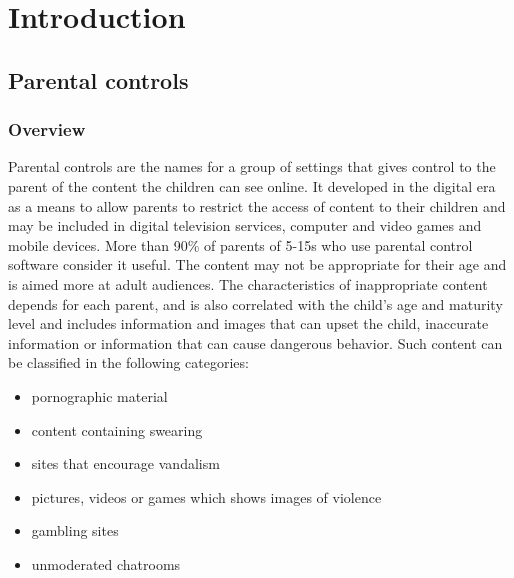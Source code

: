 
\chapter{Introduction} %

\label{Chapter1} %


\newcommand{\keyword}[1]{\textbf{#1}}
\newcommand{\tabhead}[1]{\textbf{#1}}
\newcommand{\code}[1]{\texttt{#1}}
\newcommand{\file}[1]{\texttt{\bfseries#1}}
\newcommand{\option}[1]{\texttt{\itshape#1}}


\section{Parental controls}

\subsection{Overview}
Parental controls \cite{parentalControls} are the names for a group of settings that gives control to the parent of the content the children can see online. It developed in the digital era as a means to allow parents to restrict the access of content to their children and may be included in digital television services, computer and video games and mobile devices. More than 90\% of parents  of 5-15s who use parental control software consider it useful. \citep{ofcom2017children} The content may not be appropriate for their age and is aimed more at adult audiences. The characteristics of inappropriate content depends for each parent, and is also correlated with the child's age and maturity level and includes information and images that can upset the child, inaccurate information or information that can cause dangerous behavior. Such content can be classified in the following categories:

\begin{itemize}
\item pornographic material
\item content containing swearing
\item sites that encourage vandalism
\item pictures, videos or games which shows images of violence
\item gambling sites
\item unmoderated chatrooms
\end{itemize}


